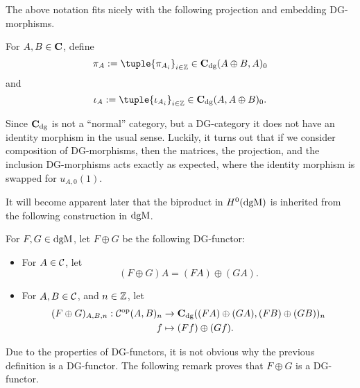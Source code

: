 The above notation fits nicely with the following projection and embedding DG-morphisms.
\begin{definition}
    For \( A, B \in \operatorname{\mathbf{C}} \), define
    \[
        \pi_A := \tuple{\pi_{A_i}}_{i \in \Zb} \in \C_{\dg}(A \oplus B, A)_0
    \]
    and
    \[
        \iota_A := \tuple{\iota_{A_i}}_{i \in \Zb} \in \C_{\dg}(A, A \oplus B)_0.
    \]
\end{definition}

Since \( \operatorname{\mathbf{C}}_{\operatorname{dg}} \) is not a ``normal'' category, but a DG-category it does not have an identity morphism in the usual sense. Luckily, it turns out that if we consider composition of DG-morphisms, then the matrices, the projection, and the inclusion DG-morphisms acts exactly as expected, where the identity morphism is swapped for \( u_{A, 0}(1) \).

It will become apparent later that the biproduct in \( H^0(\operatorname{dgM}) \) is inherited from the following construction in \( \operatorname{dgM} \).

\begin{definition}
    \label{def:dgm_biproduct}
    For \( F, G \in \operatorname{dgM} \), let \( F \oplus G \) be the following DG-functor:
    \begin{itemize}
        \item {
            For \( A \in {\mathcal{C}} \), let
            \[
                (F \oplus G) A = (F A) \oplus (G A).
            \]
        }
        \item {
            For \( A, B \in {\mathcal{C}} \), and \( n \in {\mathbb{Z}} \), let
            \begin{align*}
                (F \oplus G)_{A, B, n}: {\mathcal{C}}^{\operatorname{op}}(A, B)_n &\to \operatorname{\mathbf{C}}_{\operatorname{dg}}((F A) \oplus (G A), (F B) \oplus (G B))_n \\
                f &\mapsto (F f) \oplus (G f).
            \end{align*}
        }
    \end{itemize}
\end{definition}

Due to the properties of DG-functors, it is not obvious why the previous definition is a DG-functor. The following remark proves that \( F \oplus G \) is a DG-functor.

